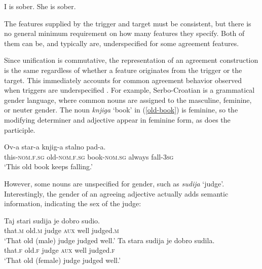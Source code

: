 \documentclass[output=paper]{langsci/langscibook}
\begin{document}
\begin{exe}
\ex \label{sober}
\begin{xlist}
\ex *I is sober.
\ex She is sober.
 \end{xlist}
 \end{exe}
 
\noindent
The features supplied by the trigger and target must be consistent, but 
there is no general minimum requirement on how many features they specify.  Both of them can be, and typically are, underspecified for some agreement features.  

Since unification
is commutative, the representation of an agreement construction is the same regardless of whether a feature originates from the trigger or the target.  This immediately accounts for common agreement behavior observed when triggers are underspecified  \citep{Barlow:1988}.  
For example, Serbo-Croatian is a grammatical gender language, where common nouns are assigned to the  masculine, feminine, or neuter gender.   The noun \textit{knjiga} ‘book’ in (\ref{old-book}) is feminine, so the modifying determiner and adjective appear in feminine form, as does the participle.   

\begin{exe}
\ex \label{old-book}
\gll Ov-a	star-a	knjig-a stalno  pad-a. \\
this-\textsc{nom.f.sg}	old-\textsc{nom.f.sg}	book-\textsc{nom.sg} always fall-\textsc{3sg} \\
\glt `This old book keeps falling.'  \citep[p. / 4, ex. 1]{Wechsler+Zlatic:2003}
\end{exe} 


\noindent
However, some nouns are unspecified for gender, such as \textit{sudija}  ‘judge’.  Interestingly, the gender of an agreeing adjective actually adds semantic information, indicating the sex of the judge:

\begin{exe}
\ex \label{sudija}
\begin{xlist}
\ex
\gll 	Taj	stari	sudija	je	dobro	sudio.	 \\
that.\textsc{m}	old.\textsc{m}	judge	\textsc{aux}	well	judged.\textsc{m} \\
\glt `That old (male) judge judged well.'
\ex 
 \gll
	Ta	 stara	sudija	je	dobro	sudila. \\
that.\textsc{f}	old.\textsc{f}	judge	\textsc{aux}	well	judged.\textsc{f}\\
	\glt ‘That old (female) judge  judged well.’
\end{xlist}
\end{exe}
\end{document}
